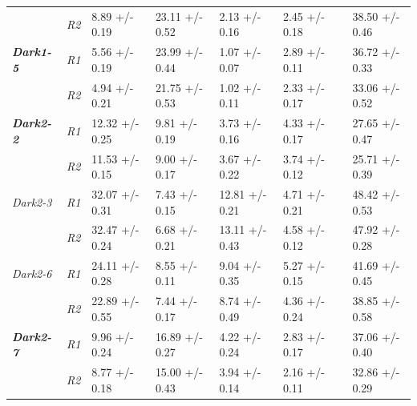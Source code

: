 \begin{table}[h]
\begin{tabular}{|l|l|l|l|l|l|l|l|}
                              & \textit{R2}                   & 8.89 +/- 0.19      & 23.11 +/- 0.52    & 2.13 +/- 0.16      & 2.45 +/- 0.18          &  & 38.50 +/- 0.46      \\ \cmidrule(r){1-6} \cmidrule(l){8-8} 
         \textbf{\textit{Dark1-5}}     & \textit{R1}          & 5.56 +/- 0.19      & 23.99 +/- 0.44    & 1.07 +/- 0.07      & 2.89 +/- 0.11          &  & 36.72 +/- 0.33      \\ \cmidrule(lr){2-2}
                              & \textit{R2}                   & 4.94 +/- 0.21      & 21.75 +/- 0.53    & 1.02 +/- 0.11      & 2.33 +/- 0.17          &  & 33.06 +/- 0.52      \\ \cmidrule(r){1-6} \cmidrule(l){8-8} 
         \textbf{\textit{Dark2-2}}     & \textit{R1}          & 12.32 +/- 0.25     & 9.81 +/- 0.19     & 3.73 +/- 0.16      & 4.33 +/- 0.17          &  & 27.65 +/- 0.47      \\ \cmidrule(lr){2-2}
                              & \textit{R2}                   & 11.53 +/- 0.15     & 9.00 +/- 0.17     & 3.67 +/- 0.22      & 3.74 +/- 0.12          &  & 25.71 +/- 0.39      \\ \cmidrule(r){1-6} \cmidrule(l){8-8} 
         \textit{Dark2-3}     & \textit{R1}                   & 32.07 +/- 0.31     & 7.43 +/- 0.15     & 12.81 +/- 0.21     & 4.71 +/- 0.21          &  & 48.42 +/- 0.53      \\ \cmidrule(lr){2-2}
                              & \textit{R2}                   & 32.47 +/- 0.24     & 6.68 +/- 0.21     & 13.11 +/- 0.43     & 4.58 +/- 0.12          &  & 47.92 +/- 0.28      \\ \cmidrule(r){1-6} \cmidrule(l){8-8} 
         \textit{Dark2-6}     & \textit{R1}                   & 24.11 +/- 0.28     & 8.55 +/- 0.11     & 9.04 +/- 0.35      & 5.27 +/- 0.15          &  & 41.69 +/- 0.45      \\ \cmidrule(lr){2-2}
                              & \textit{R2}                   & 22.89 +/- 0.55     & 7.44 +/- 0.17     & 8.74 +/- 0.49      & 4.36 +/- 0.24          &  & 38.85 +/- 0.58      \\ \cmidrule(r){1-6} \cmidrule(l){8-8} 
         \textbf{\textit{Dark2-7}}     & \textit{R1}          & 9.96 +/- 0.24      & 16.89 +/- 0.27    & 4.22 +/- 0.24      & 2.83 +/- 0.17          &  & 37.06 +/- 0.40      \\ \cmidrule(lr){2-2}
                              & \textit{R2}                   & 8.77 +/- 0.18      & 15.00 +/- 0.43    & 3.94 +/- 0.14      & 2.16 +/- 0.11          &  & 32.86 +/- 0.29      \\ \cmidrule(r){1-6} \cmidrule(l){8-8} 

\end{tabular}
\end{table}
